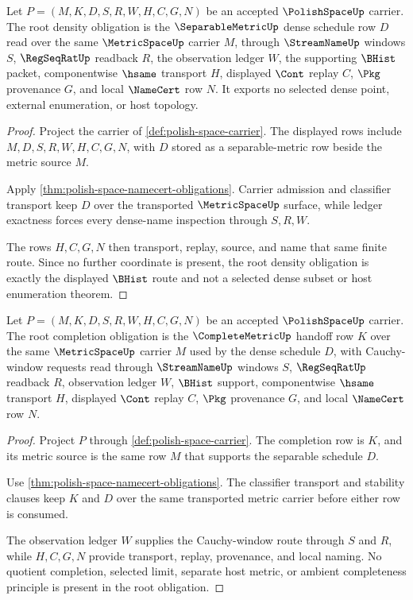 \begin{theorem}
\label{thm:polishspace-root-density-obligations}
Let $P=(M,K,D,S,R,W,H,C,G,N)$ be an accepted $\PolishSpaceUp$ carrier. The
root density obligation is the $\SeparableMetricUp$ dense schedule row $D$
read over the same $\MetricSpaceUp$ carrier $M$, through $\StreamNameUp$
windows $S$, $\RegSeqRatUp$ readback $R$, the observation ledger $W$, the
supporting $\BHist$ packet, componentwise $\hsame$ transport $H$, displayed
$\Cont$ replay $C$, $\Pkg$ provenance $G$, and local $\NameCert$ row $N$.
It exports no selected dense point, external enumeration, or host topology.
\end{theorem}
\begin{proof}
Project the carrier of \autoref{def:polish-space-carrier}. The displayed
rows include $M,D,S,R,W,H,C,G,N$, with $D$ stored as a separable-metric row
beside the metric source $M$.

Apply \autoref{thm:polish-space-namecert-obligations}. Carrier admission and
classifier transport keep $D$ over the transported $\MetricSpaceUp$ surface,
while ledger exactness forces every dense-name inspection through $S,R,W$.

The rows $H,C,G,N$ then transport, replay, source, and name that same finite
route. Since no further coordinate is present, the root density obligation is
exactly the displayed $\BHist$ route and not a selected dense subset or host
enumeration theorem.
\end{proof}

\begin{theorem}
\label{thm:polishspace-root-completion-obligations}
Let $P=(M,K,D,S,R,W,H,C,G,N)$ be an accepted $\PolishSpaceUp$ carrier. The
root completion obligation is the $\CompleteMetricUp$ handoff row $K$ over
the same $\MetricSpaceUp$ carrier $M$ used by the dense schedule $D$, with
Cauchy-window requests read through $\StreamNameUp$ windows $S$,
$\RegSeqRatUp$ readback $R$, observation ledger $W$, $\BHist$ support,
componentwise $\hsame$ transport $H$, displayed $\Cont$ replay $C$, $\Pkg$
provenance $G$, and local $\NameCert$ row $N$.
\end{theorem}
\begin{proof}
Project $P$ through \autoref{def:polish-space-carrier}. The completion row is
$K$, and its metric source is the same row $M$ that supports the separable
schedule $D$.

Use \autoref{thm:polish-space-namecert-obligations}. The classifier transport
and stability clauses keep $K$ and $D$ over the same transported metric
carrier before either row is consumed.

The observation ledger $W$ supplies the Cauchy-window route through $S$ and
$R$, while $H,C,G,N$ provide transport, replay, provenance, and local naming.
No quotient completion, selected limit, separate host metric, or ambient
completeness principle is present in the root obligation.
\end{proof}

